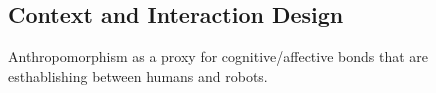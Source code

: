 \documentclass[lettersize, apacite, twoside, HRI]{apa_HRI}
\begin{document}
\subsection{Context and Interaction Design}



Anthropomorphism as a proxy for cognitive/affective bonds that are esthablishing
between humans and robots.




%
%
\end{document}
